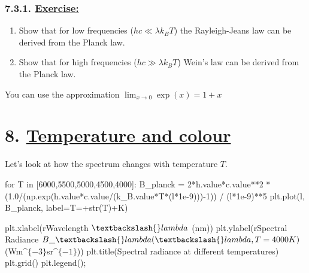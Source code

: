\documentclass[
  letterpaper,
  DIV=11,
  numbers=noendperiod]{scrartcl}
\newenvironment{Shaded}{\begin{snugshade}}{\end{snugshade}}
\newcommand{\BuiltInTok}[1]{\textcolor[rgb]{0.00,0.23,0.31}{#1}}
\newcommand{\ControlFlowTok}[1]{\textcolor[rgb]{0.00,0.23,0.31}{#1}}
\newcommand{\DecValTok}[1]{\textcolor[rgb]{0.68,0.00,0.00}{#1}}
\newcommand{\FloatTok}[1]{\textcolor[rgb]{0.68,0.00,0.00}{#1}}
\newcommand{\KeywordTok}[1]{\textcolor[rgb]{0.00,0.23,0.31}{#1}}
\newcommand{\NormalTok}[1]{\textcolor[rgb]{0.00,0.23,0.31}{#1}}
\newcommand{\OperatorTok}[1]{\textcolor[rgb]{0.37,0.37,0.37}{#1}}
\newcommand{\StringTok}[1]{\textcolor[rgb]{0.13,0.47,0.30}{#1}}
\newcommand{\VerbatimStringTok}[1]{\textcolor[rgb]{0.13,0.47,0.30}{#1}}
\providecommand{\tightlist}{%
  \setlength{\itemsep}{0pt}\setlength{\parskip}{0pt}}\usepackage{longtable,booktabs,array}
\begin{document}
\hypertarget{exercise}{%
\subsubsection{\texorpdfstring{7.3.1.
\protect\hyperlink{toc0_}{Exercise:}}{7.3.1. Exercise:}}\label{exercise}}

\begin{enumerate}
\def\labelenumi{\arabic{enumi}.}
\tightlist
\item
  Show that for low frequencies (\(hc \ll \lambda k_B T\)) the
  Rayleigh-Jeans law can be derived from the Planck law.
\item
  Show that for high frequencies (\(hc \gg \lambda k_B T\)) Wein's law
  can be derived from the Planck law.
\end{enumerate}

You can use the approximation \(\lim_{x\rightarrow 0} \exp(x) = 1 + x\)

\hypertarget{temperature-and-colour}{%
\section{\texorpdfstring{8. \protect\hyperlink{toc0_}{Temperature and
colour}}{8. Temperature and colour}}\label{temperature-and-colour}}

Let's look at how the spectrum changes with temperature \(T\).

\begin{Shaded}
\begin{Highlighting}[]
\ControlFlowTok{for}\NormalTok{ T }\KeywordTok{in}\NormalTok{ [}\DecValTok{6000}\NormalTok{,}\DecValTok{5500}\NormalTok{,}\DecValTok{5000}\NormalTok{,}\DecValTok{4500}\NormalTok{,}\DecValTok{4000}\NormalTok{]:}
\NormalTok{    B\_planck }\OperatorTok{=} \DecValTok{2}\OperatorTok{*}\NormalTok{h.value}\OperatorTok{*}\NormalTok{c.value}\OperatorTok{**}\DecValTok{2} \OperatorTok{*}\NormalTok{ (}\FloatTok{1.0}\OperatorTok{/}\NormalTok{(np.exp(h.value}\OperatorTok{*}\NormalTok{c.value}\OperatorTok{/}\NormalTok{(k\_B.value}\OperatorTok{*}\NormalTok{T}\OperatorTok{*}\NormalTok{(l}\OperatorTok{*}\FloatTok{1e{-}9}\NormalTok{)))}\OperatorTok{{-}}\DecValTok{1}\NormalTok{)) }\OperatorTok{/}\NormalTok{ (l}\OperatorTok{*}\FloatTok{1e{-}9}\NormalTok{)}\OperatorTok{**}\DecValTok{5}
\NormalTok{    plt.plot(l, B\_planck, label}\OperatorTok{=}\StringTok{\textquotesingle{}T=\textquotesingle{}}\OperatorTok{+}\BuiltInTok{str}\NormalTok{(T)}\OperatorTok{+}\StringTok{\textquotesingle{}K\textquotesingle{}}\NormalTok{)}

\NormalTok{plt.xlabel(}\VerbatimStringTok{r\textquotesingle{}Wavelength $\textbackslash{}lambda$ (nm)\textquotesingle{}}\NormalTok{)}
\NormalTok{plt.ylabel(}\VerbatimStringTok{r\textquotesingle{}Spectral Radiance $B\_\textbackslash{}lambda(\textbackslash{}lambda, T=4000K)$ (Wm$\^{}\{{-}3\}$sr$\^{}\{{-}1\}$)\textquotesingle{}}\NormalTok{)}
\NormalTok{plt.title(}\StringTok{\textquotesingle{}Spectral radiance at different temperatures\textquotesingle{}}\NormalTok{)}
\NormalTok{plt.grid()}
\NormalTok{plt.legend()}\OperatorTok{;}
\end{Highlighting}
\end{Shaded}
\end{document}

